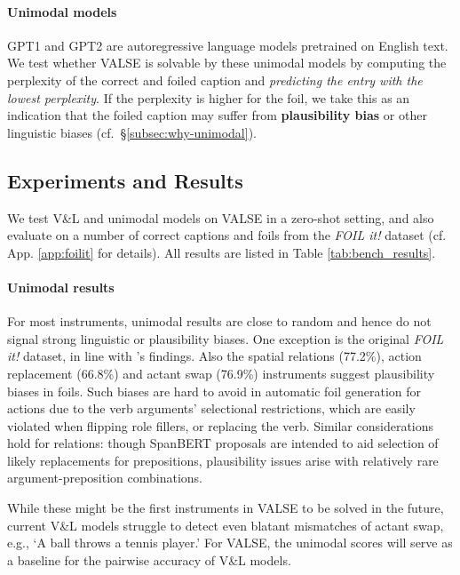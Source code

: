\documentclass[11pt]{article}
\newcommand{\dataset}{VALSE}
\begin{document}
\paragraph{Unimodal models} GPT1 and GPT2
are
autoregressive language models pretrained on English text. We test whether \dataset{} is solvable by these unimodal models by computing the perplexity of the correct and foiled caption and \textit{predicting the entry with the lowest perplexity}. 
If the perplexity is higher for the foil, 
we take this as an indication that the foiled caption may suffer from \textbf{plausibility bias} or other linguistic biases (cf.\ \S \ref{subsec:why-unimodal}).

\subsection{Experiments and Results}
\label{subsec:experiments}
We test V\&L and unimodal models on \dataset{} in a zero-shot setting, 
and also evaluate on a number of correct captions and foils from the \textit{FOIL it!} dataset \cite{shekhar-etal-2017-foil} (cf. App. \ref{app:foilit} for details).
All results are listed in Table \ref{tab:bench_results}.




\paragraph{Unimodal results} For most instruments, unimodal results are close to random and hence do not signal strong linguistic or plausibility biases.
One exception is the original \textit{FOIL it!} dataset, in line with \citet{madhyastha-etal-2019-vifidel}'s findings.
Also the spatial relations (77.2\%), action replacement (66.8\%) and actant swap (76.9\%) instruments 
suggest plausibility biases in 
foils. Such biases are hard to avoid in automatic foil generation for actions due to the verb arguments' selectional restrictions, which are easily  violated when flipping role fillers, or replacing
the verb. 
Similar considerations hold for relations: though SpanBERT proposals are intended to aid selection of likely replacements for prepositions, plausibility issues arise with relatively rare argument-preposition combinations.

While these might be the first instruments in \dataset{} to be solved in the future, current V\&L models struggle to detect even blatant mismatches of actant swap, e.g., `A ball throws a tennis player.'
For \dataset{}, the unimodal scores will serve as a baseline for the pairwise accuracy of V\&L models.
\end{document}
